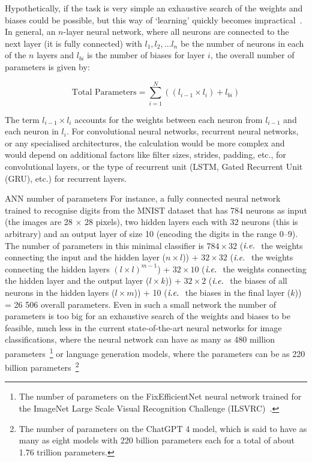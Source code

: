 Hypothetically, if the task is very simple an exhaustive search of the weights and biases could be possible, but this way of `learning' quickly becomes impractical~\cite{BianchiniS14}. 
In general, an $n$-layer neural network, where all neurons are connected to the next layer (\ie it is fully connected) with $l_1,l_2,\dots l_n$ be the number of neurons in each of the $n$ layers and $l_{bi}$ is the number of biases for layer $i$, the overall number of parameters is given by:

\begin{equation}
\text{Total Parameters} = \sum_{i=1}^{N} \left( (l_{i-1} \times l_{i}) + l_{bi} \right)
\end{equation}


The term $l_{i-1} \times l_{i}$ accounts for the weights between each neuron from $l_{i-1}$ and each neuron in $l_{i}$. For convolutional neural networks, recurrent neural networks, or any specialised architectures, the calculation would be more complex and would depend on additional factors like filter sizes, strides, padding, etc., for convolutional layers, or the type of recurrent unit (LSTM, Gated Recurrent Unit (GRU), etc.) for recurrent layers.


\begin{Example}{ANN number of parameters}{}
For instance, a fully connected neural network trained to recognise digits from the MNIST dataset that has 784 neurons as input (the images are 28 $\times$ 28 pixels), two hidden layers each with 32 neurons (this is arbitrary) and an output layer of size 10 (encoding the digits in the range 0--9). The number of parameters in this minimal classifier is $784 \times 32$ ($\textit{i.e.}\ $ the weights connecting the input and the hidden layer ($n \times l$)) + $32 \times 32$ ($\textit{i.e.}\ $ the weights connecting the hidden layers $(l \times l)^{m-1}$) + $32 \times 10$ ($\textit{i.e.}\ $ the weights connecting the hidden layer and the output layer ($l \times k$)) + $32 \times 2$ ($\textit{i.e.}\ $ the biases of all neurons in the hidden layers ($l \times m$)) + 10 ($\textit{i.e.}\ $ the  biases in the final layer ($k$)) = 26 506 overall parameters. Even in such a small network the number of parameters is too big for an exhaustive search of the weights and biases to be feasible, much less in the current state-of-the-art neural networks for image classifications, where the neural network can have as many as 480 million parameters~\footnote{The number of parameters on the FixEfficientNet neural network trained for the ImageNet Large Scale Visual Recognition Challenge (ILSVRC)~\cite{FixEff}.}
or language generation models, where the parameters can be as 220 billion parameters~\footnote{The number of parameters on the ChatGPT 4 model, which is said to have  as many as eight models with 220 billion parameters each for a total of about 1.76 trillion parameters.}
\end{Example}

